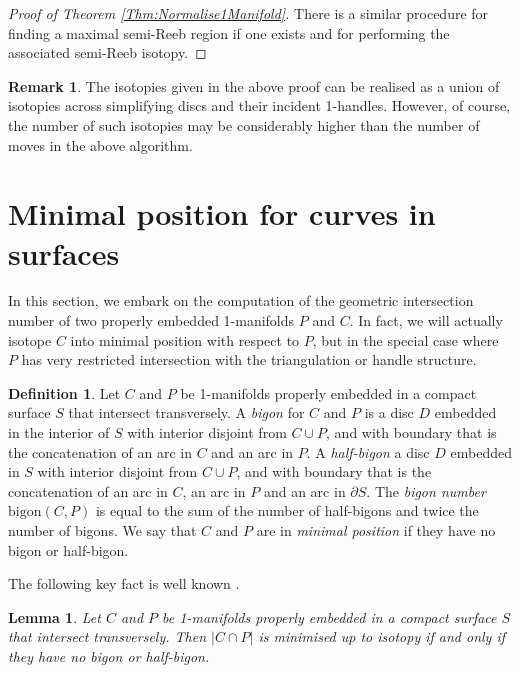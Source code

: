 \documentclass[oneside]{amsart}
\numberwithin{equation}{section}
\theoremstyle{plain}
\newtheorem{lemma}[equation]{Lemma}
\theoremstyle{definition}
\newtheorem{definition}[equation]{Definition}
\newtheorem{remark}[equation]{Remark}
\begin{document}
\begin{proof}[Proof of Theorem \ref{Thm:Normalise1Manifold}]
There is a similar procedure for finding a maximal semi-Reeb region if one exists and for performing the associated semi-Reeb isotopy.
\end{proof}

\begin{remark}
\label{Rem:CompositionSmallIsotopies}
The isotopies given in the above proof can be realised as a union of isotopies across simplifying discs and their incident 1-handles. However, of course, the number of such isotopies may be considerably higher than the number of moves in the above algorithm.
\end{remark}

\section{Minimal position for curves in surfaces}
\label{Sec:MinimalPositionCurves}

In this section, we embark on the computation of the geometric intersection number of two properly embedded 1-manifolds $P$ and $C$. In fact, we will actually isotope $C$ into minimal position with respect to $P$, but in the special case where $P$ has very restricted intersection with the triangulation or handle structure.

\begin{definition} 
Let $C$ and $P$ be 1-manifolds properly embedded in a compact surface $S$ that intersect transversely. A \emph{bigon} for $C$ and $P$ is a disc $D$ embedded in the interior of $S$ with interior disjoint from $C \cup P$, and with boundary that is the concatenation of an arc in $C$ and an arc in $P$. A \emph{half-bigon} a disc $D$ embedded in $S$ with interior disjoint from $C \cup P$, and with boundary that is the concatenation of an arc in $C$, an arc in $P$ and an arc in $\partial S$. The \emph{bigon number} $\mathrm{bigon}(C,P)$ is equal to the sum of the number of half-bigons and twice the number of bigons.
We say that $C$ and $P$ are in \emph{minimal position} if they have no bigon or half-bigon.
\end{definition}

The following key fact is well known \cite[Proposition 1.7 and Section 1.2.7]{FarbMargalit}.

\begin{lemma}
\label{Lem:MinimalNoBigon}
Let $C$ and $P$ be 1-manifolds properly embedded in a compact surface $S$ that intersect transversely. Then $|C \cap P|$ is minimised up to isotopy if and only if they have no bigon or half-bigon.
\end{lemma}
\end{document}
